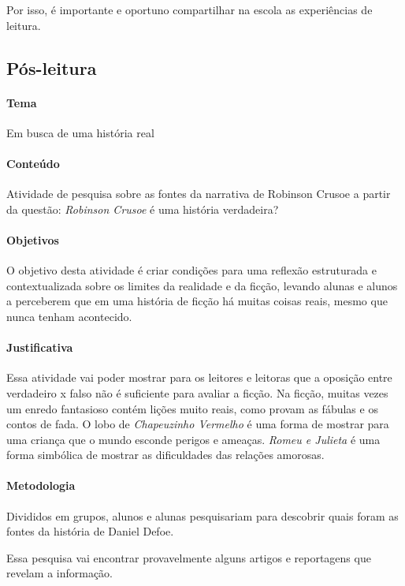 \documentclass[12pt]{extarticle}
\begin{document}
Por isso, é importante e oportuno compartilhar na escola as experiências
de leitura.

\subsection{Pós-leitura}

\paragraph{Tema} Em busca de uma história real


\paragraph{Conteúdo} Atividade de pesquisa sobre as fontes da narrativa de Robinson Crusoe a partir da questão: \emph{Robinson Crusoe} é uma história verdadeira?

\paragraph{Objetivos}
O objetivo desta atividade é criar condições para uma reflexão
estruturada e contextualizada sobre os limites da realidade e da ficção,
levando alunas e alunos a perceberem que em uma história de ficção há
muitas coisas reais, mesmo que nunca tenham acontecido.

\paragraph{Justificativa}
Essa atividade vai poder mostrar para os leitores e leitoras que a
oposição entre verdadeiro x falso não é suficiente para avaliar a
ficção. Na ficção, muitas vezes um enredo fantasioso contém lições muito
reais, como provam as fábulas e os contos de fada. O lobo de
\emph{Chapeuzinho Vermelho} é uma forma de mostrar para uma criança que
o mundo esconde perigos e ameaças. \emph{Romeu e Julieta} é uma forma
simbólica de mostrar as dificuldades das relações amorosas.

\paragraph{Metodologia}
Divididos em grupos, alunos e alunas pesquisariam para descobrir quais
foram as fontes da história de Daniel Defoe.

Essa pesquisa vai encontrar provavelmente alguns artigos e reportagens
que revelam a informação.
\end{document}
